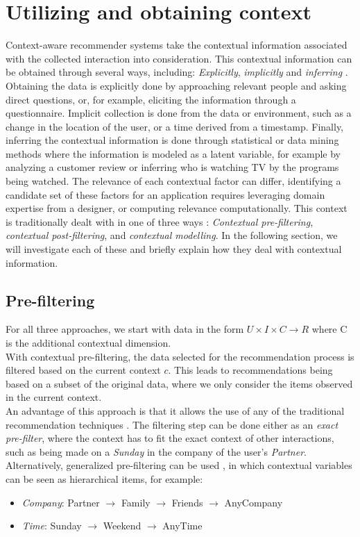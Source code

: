 \section{Utilizing and obtaining context}
Context-aware recommender systems take the contextual information associated with the collected interaction into consideration.
This contextual information can be obtained through several ways, including: \textit{Explicitly}, \textit{implicitly} and \textit{inferring} \cite{RecommenderHandbook2015}.
Obtaining the data is explicitly done by approaching relevant people and asking direct questions, or, for example, eliciting the information through a questionnaire.
Implicit collection is done from the data or environment, such as a change in the location of the user, or a time derived from a timestamp.
Finally, inferring the contextual information is done through statistical or data mining methods where the information is modeled as a latent variable, for example by analyzing a customer review or inferring who is watching TV by the programs being watched.
The relevance of each contextual factor can differ, identifying a candidate set of these factors for an application requires leveraging domain expertise from a designer, or computing relevance computationally.
This context is traditionally dealt with in one of three ways \cite{Adomavicius2011}: \textit{Contextual pre-filtering}, \textit{contextual post-filtering}, and \textit{contextual modelling}.
In the following section, we will investigate each of these and briefly explain how they deal with contextual information.

\subsection*{Pre-filtering}
For all three approaches, we start with data in the form $U \times I \times C \rightarrow R$ where C is the additional contextual dimension.\\
With contextual pre-filtering, the data selected for the recommendation process is filtered based on the current context $c$.
This leads to recommendations being based on a subset of the original data, where we only consider the items observed in the current context.\\
An advantage of this approach is that it allows the use of any of the traditional recommendation techniques \cite{Adomavicius2011}.
The filtering step can be done either as an \textit{exact pre-filter}, where the context has to fit the exact context of other interactions, such as being made on a \textit{Sunday} in the company of the user's \textit{Partner}.
Alternatively, generalized pre-filtering can be used \cite{Adomavicius2011}, in which contextual variables can be seen as hierarchical items, for example:
\begin{itemize}
	\item \textit{Company}: Partner $\rightarrow$ Family $\rightarrow$ Friends $\rightarrow$ AnyCompany
	\item \textit{Time}: Sunday $\rightarrow$ Weekend $\rightarrow$ AnyTime
\end{itemize}

